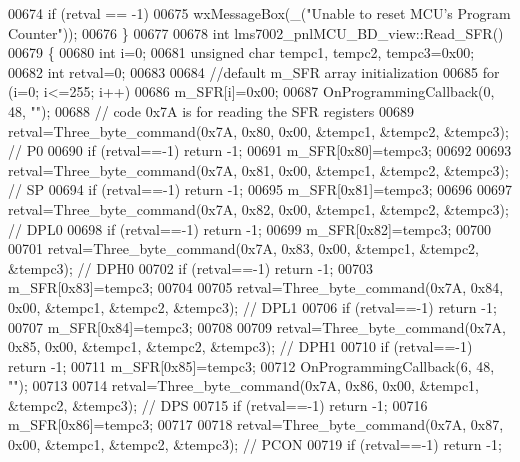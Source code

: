 \begin{DoxyCode}
{{{{{{{{{{{{{{{00674     \textcolor{keywordflow}{if} (retval == -1)
00675         wxMessageBox(\_(\textcolor{stringliteral}{"Unable to reset MCU's Program Counter"}));
00676 \}
00677 
00678 \textcolor{keywordtype}{int} lms7002_pnlMCU_BD_view::Read_SFR()
00679 \{
00680     \textcolor{keywordtype}{int} i=0;
00681     \textcolor{keywordtype}{unsigned} \textcolor{keywordtype}{char} tempc1, tempc2, tempc3=0x00;
00682     \textcolor{keywordtype}{int} retval=0;
00683 
00684     \textcolor{comment}{//default m\_SFR array initialization}
00685     \textcolor{keywordflow}{for} (i=0; i<=255; i++)
00686         m_SFR[i]=0x00;
00687         OnProgrammingCallback(0, 48, \textcolor{stringliteral}{""});
00688     \textcolor{comment}{// code 0x7A is for reading the SFR registers}
00689     retval=Three_byte_command(0x7A, 0x80, 0x00, &tempc1, &tempc2, &tempc3); \textcolor{comment}{// P0}
00690     \textcolor{keywordflow}{if} (retval==-1) \textcolor{keywordflow}{return} -1;
00691     m_SFR[0x80]=tempc3;
00692 
00693     retval=Three_byte_command(0x7A, 0x81, 0x00, &tempc1, &tempc2, &tempc3); \textcolor{comment}{// SP}
00694     \textcolor{keywordflow}{if} (retval==-1) \textcolor{keywordflow}{return} -1;
00695     m_SFR[0x81]=tempc3;
00696 
00697     retval=Three_byte_command(0x7A, 0x82, 0x00, &tempc1, &tempc2, &tempc3); \textcolor{comment}{// DPL0}
00698     \textcolor{keywordflow}{if} (retval==-1) \textcolor{keywordflow}{return} -1;
00699     m_SFR[0x82]=tempc3;
00700 
00701     retval=Three_byte_command(0x7A, 0x83, 0x00, &tempc1, &tempc2, &tempc3); \textcolor{comment}{// DPH0}
00702     \textcolor{keywordflow}{if} (retval==-1) \textcolor{keywordflow}{return} -1;
00703     m_SFR[0x83]=tempc3;
00704 
00705     retval=Three_byte_command(0x7A, 0x84, 0x00, &tempc1, &tempc2, &tempc3); \textcolor{comment}{// DPL1}
00706     \textcolor{keywordflow}{if} (retval==-1) \textcolor{keywordflow}{return} -1;
00707     m_SFR[0x84]=tempc3;
00708 
00709     retval=Three_byte_command(0x7A, 0x85, 0x00, &tempc1, &tempc2, &tempc3); \textcolor{comment}{// DPH1}
00710     \textcolor{keywordflow}{if} (retval==-1) \textcolor{keywordflow}{return} -1;
00711     m_SFR[0x85]=tempc3;
00712         OnProgrammingCallback(6, 48, \textcolor{stringliteral}{""});
00713 
00714     retval=Three_byte_command(0x7A, 0x86, 0x00, &tempc1, &tempc2, &tempc3); \textcolor{comment}{// DPS}
00715     \textcolor{keywordflow}{if} (retval==-1) \textcolor{keywordflow}{return} -1;
00716     m_SFR[0x86]=tempc3;
00717 
00718     retval=Three_byte_command(0x7A, 0x87, 0x00, &tempc1, &tempc2, &tempc3); \textcolor{comment}{// PCON}
00719     \textcolor{keywordflow}{if} (retval==-1) \textcolor{keywordflow}{return} -1;
}}}}}}}}}}}}}}}
\end{DoxyCode}
